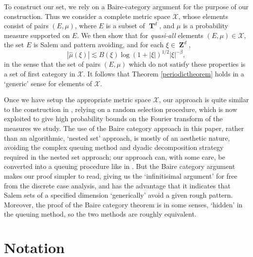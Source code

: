 \documentclass[12pt,reqno]{article}
\numberwithin{equation}{section}
\DeclareMathOperator{\ZZ}{\mathbf{Z}}
\DeclareMathOperator{\TT}{\mathbf{T}}
\begin{document}
To construct our set, we rely on a Baire-category argument for the purpose of our construction. Thus we consider a complete metric space $\mathcal{X}$, whose elements consist of pairs $(E,\mu)$, where $E$ is a subset of $\TT^d$, and $\mu$ is a probability measure supported on $E$. We then show that for \emph{quasi-all} elements $(E,\mu) \in \mathcal{X}$, the set $E$ is Salem and pattern avoiding, and for each $\xi \in \ZZ^d$,
%
\[ |\widehat{\mu}(\xi)| \lesssim B(\xi) \log(1 + |\xi|)^{1/2} |\xi|^{-\beta}, \]
%
in the sense that the set of pairs $(E,\mu)$ which do not satisfy these properties is a set of first category in $\mathcal{X}$. It follows that Theorem \ref{periodictheorem} holds in a `generic' sense for elements of $\mathcal{X}$.

Once we have setup the appropriate metric space $\mathcal{X}$, our approach is quite similar to the construction in \cite{OurPaper}, relying on a random selection procedure, which is now exploited to give high probability bounds on the Fourier transform of the measures we study. The use of the Baire category approach in this paper, rather than an algorithmic, `nested set' approach, is mostly of an aesthetic nature, avoiding the complex queuing method and dyadic decomposition strategy required in the nested set approach; our approach can, with some care, be converted into a queuing procedure like in \cite{OurPaper}. But the Baire category argument makes our proof simpler to read, giving us the `infinitisimal argument' for free from the discrete case analysis, and has the advantage that it indicates that Salem sets of a specified dimension `generically' avoid a given rough pattern. Moreover, the proof of the Baire category theorem is in some senses, `hidden' in the queuing method, so the two methods are roughly equivalent.

\section{Notation} \label{notationSection}
\end{document}
